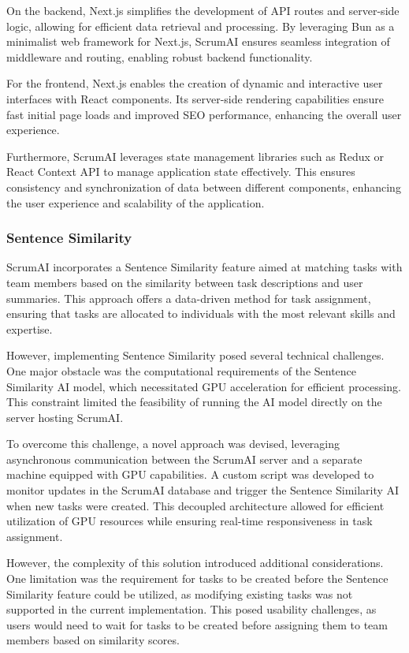 \documentclass[conference]{IEEEtran}
\begin{document}
On the backend, Next.js simplifies the development of API routes and server-side logic, allowing for efficient data retrieval and processing. By leveraging Bun as a minimalist web framework for Next.js, ScrumAI ensures seamless integration of middleware and routing, enabling robust backend functionality.

For the frontend, Next.js enables the creation of dynamic and interactive user interfaces with React components. Its server-side rendering capabilities ensure fast initial page loads and improved SEO performance, enhancing the overall user experience.

Furthermore, ScrumAI leverages state management libraries such as Redux or React Context API to manage application state effectively. This ensures consistency and synchronization of data between different components, enhancing the user experience and scalability of the application.


\subsubsection{Sentence Similarity}
ScrumAI incorporates a Sentence Similarity feature aimed at matching tasks with team members based on the similarity between task descriptions and user summaries. This approach offers a data-driven method for task assignment, ensuring that tasks are allocated to individuals with the most relevant skills and expertise.

However, implementing Sentence Similarity posed several technical challenges. One major obstacle was the computational requirements of the Sentence Similarity AI model, which necessitated GPU acceleration for efficient processing. This constraint limited the feasibility of running the AI model directly on the server hosting ScrumAI.

To overcome this challenge, a novel approach was devised, leveraging asynchronous communication between the ScrumAI server and a separate machine equipped with GPU capabilities. A custom script was developed to monitor updates in the ScrumAI database and trigger the Sentence Similarity AI when new tasks were created. This decoupled architecture allowed for efficient utilization of GPU resources while ensuring real-time responsiveness in task assignment.

However, the complexity of this solution introduced additional considerations. One limitation was the requirement for tasks to be created before the Sentence Similarity feature could be utilized, as modifying existing tasks was not supported in the current implementation. This posed usability challenges, as users would need to wait for tasks to be created before assigning them to team members based on similarity scores.
\end{document}
